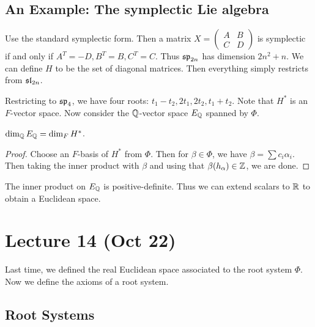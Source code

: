\documentclass[twoside, 10pt]{article}
\begin{document}
    \subsection{An Example: The symplectic Lie algebra}%
    \label{sub:an_example_the_symplectic_lie_algebra}

    Use the standard symplectic form. Then a matrix $X = \begin{pmatrix}
        A & B \\ C & D
    \end{pmatrix}$ is symplectic if and only if $A^T = -D, B^T = B, C^T = C$. Thus $\mathfrak{sp}_{2n}$ has dimension $2n^2+n$. We can define $H$ to be the set of diagonal matrices. Then everything simply restricts from $\mathfrak{sl}_{2n}$.

    Restricting to $\mathfrak{sp}_4$, we have four roots: $t_1-t_2, 2t_1, 2t_2, t_1+t_2$. Note that $H^*$ is an $F$-vector space. Now consider the $\mathbb{Q}$-vector space $E_{\mathbb{Q}}$ spanned by $\Phi$.

    \begin{prop}
        $\dim_{\mathbb{Q}} E_{\mathbb{Q}} = \dim_F H^*$.
    \end{prop}

    \begin{proof}
        Choose an $F$-basis of $H^*$ from $\Phi$. Then for $\beta \in \Phi$, we have $\beta = \sum c_i \alpha_i$. Then taking the inner product with $\beta$ and using that $\beta(h_{\alpha}) \in \mathbb{Z}$, we are done.
    \end{proof}

    \begin{rmk}
        The inner product on $E_{\mathbb{Q}}$ is positive-definite. Thus we can extend scalars to $\mathbb{R}$ to obtain a Euclidean space.
    \end{rmk}
    
    \section{Lecture 14 (Oct 22)}%
    \label{sec:lecture_14_oct_22_}
    
    Last time, we defined the real Euclidean space associated to the root system $\Phi$. Now we define the axioms of a root system.

    \subsection{Root Systems}%
    \label{sub:root_systems}
    
\end{document}
